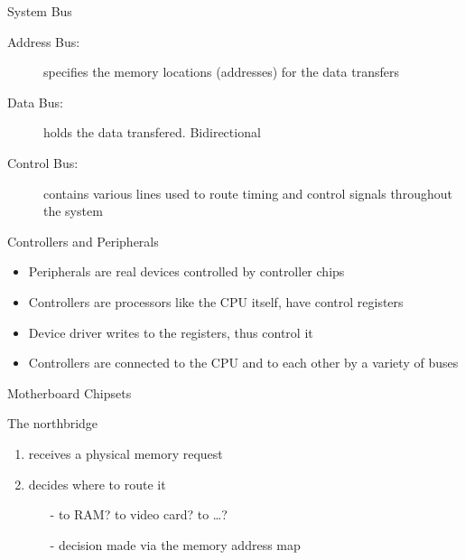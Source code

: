 \begin{frame}{System Bus}
  \begin{center}
  \end{center}
  \begin{description}
  \item[Address Bus:] specifies the memory locations (addresses) for the
    data transfers
  \item[Data Bus:] holds the data transfered. Bidirectional
  \item[Control Bus:] contains various lines used to route timing and
    control signals throughout the system
  \end{description}
\end{frame}

\begin{frame}{Controllers and Peripherals}
  \begin{itemize}
  \item Peripherals are real devices controlled by controller chips
  \item Controllers are processors like the CPU itself, have control registers
  \item Device driver writes to the registers, thus control it
  \item Controllers are connected to the CPU and to each other by a variety of buses
  \end{itemize}
\end{frame}

\begin{frame}[label=current]
  \begin{center}
  \end{center}
\end{frame}

\begin{frame}{Motherboard Chipsets}
  \begin{center}
  \end{center}
  \begin{block}{The northbridge}
    \begin{enumerate}
    \item receives a physical memory request
    \item decides where to route it
      \begin{itemize}
      \item[-] to RAM? to video card? to \ldots{}?
      \item[-] decision made via the \alert{memory address map}
      \end{itemize}
    \end{enumerate}
  \end{block}
\end{frame}

